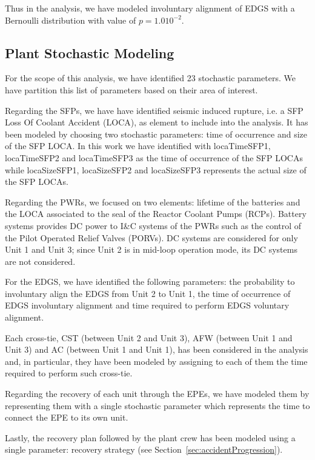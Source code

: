 Thus in the analysis, we have modeled involuntary alignment of EDGS with a Bernoulli 
distribution with value of $p=1.0 10^{-2}$.

\subsection{Plant Stochastic Modeling}
\label{sec:plantStochasticModeling}
For the scope of this analysis, we have identified 23 stochastic parameters. We have 
partition this list of parameters based on their area of interest.

Regarding the SFPs, we have have identified seismic induced rupture, i.e. a SFP Loss Of
Coolant Accident (LOCA), as 
element to include into the analysis. It has been modeled by choosing two stochastic 
parameters: time of  occurrence and size of the SFP LOCA. In this work we have identified 
with locaTimeSFP1, locaTimeSFP2 and locaTimeSFP3 as the time of occurrence of the SFP 
LOCAs while locaSizeSFP1, locaSizeSFP2 and locaSizeSFP3 represents the actual size of 
the SFP LOCAs.

Regarding the PWRs, we focused on two elements: lifetime of the batteries and the LOCA 
associated to the seal of the Reactor Coolant Pumps (RCPs). Battery systems provides 
DC power to I\&C systems 
of the PWRs such as the control of the Pilot Operated Relief Valves (PORVs).
DC systems are considered for only 
Unit 1 and Unit 3; since Unit 2 is in mid-loop operation mode, its DC systems are not 
considered.

For the EDGS, we have identified the following parameters: the probability to 
involuntary align the EDGS from Unit 2 to Unit 1, the time of occurrence of EDGS
involuntary alignment and time required to perform EDGS voluntary alignment.  

Each cross-tie, CST (between Unit 2 and Unit 3), AFW (between Unit 1 and Unit 3) 
and AC (between Unit 1 and Unit 1), has been considered in the analysis and, in 
particular, they have been modeled by assigning to each of them the time required 
to perform such cross-tie.

Regarding the recovery of each unit through the EPEs, we have modeled them by 
representing them with a single stochastic parameter which represents the
time to connect the EPE to its own unit.

Lastly, the recovery plan followed by the plant crew has been modeled using a single
parameter: recovery strategy (see Section~\ref{sec:accidentProgression}).


